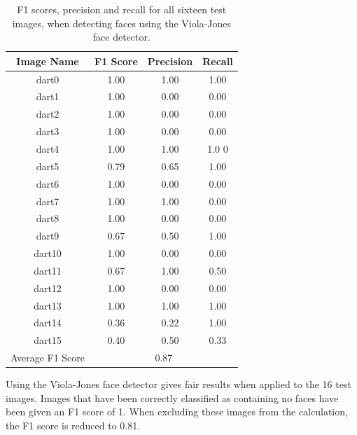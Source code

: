 \documentclass[conference]{IEEEtran}
\begin{document}
\begin{table}[htp]
\caption{F1 scores, precision and recall for all sixteen test images, when detecting faces using the Viola-Jones face detector.}
\begin{center}
\begin{tabular}{||c|c|c|c||}
\hline
Image Name			 	& F1 Score 	& Precision	& Recall            \\ \hline
dart0						& 1.00		&	1.00		& 1.00		\\
dart1						& 1.00		&	0.00		& 0.00		\\
dart2						& 1.00		&	0.00		& 0.00		\\
dart3						& 1.00		&	0.00		& 0.00		\\
dart4						& 1.00		&	1.00		& 1.0	0		\\
dart5						& 0.79		&	0.65		& 1.00		\\
dart6						& 1.00		&	0.00		& 0.00		\\
dart7						& 1.00		&	1.00		& 0.00		\\
dart8						& 1.00		&	0.00		& 0.00		\\
dart9						& 0.67		&	0.50		& 1.00		\\
dart10					& 1.00		&	0.00		& 0.00		\\
dart11					& 0.67		&	1.00		& 0.50		\\
dart12					& 1.00		&	0.00		& 0.00		\\
dart13					& 1.00		&	1.00		& 1.00		\\
dart14					& 0.36		&	0.22		& 1.00		\\
dart15					& 0.40		&	0.50		& 0.33		\\ \hline
Average F1 Score 		 	&	\multicolumn{3}{c||}{0.87} 			\\ \hline
\end{tabular}
\end{center}
\label{default}
\end{table}
\par
Using the Viola-Jones face detector gives fair results when applied to the 16 test images. Images that have been correctly classified as containing no faces have been given an F1 score of 1. When excluding these images from the calculation, the F1 score is reduced to 0.81.




\newpage
\end{document}
